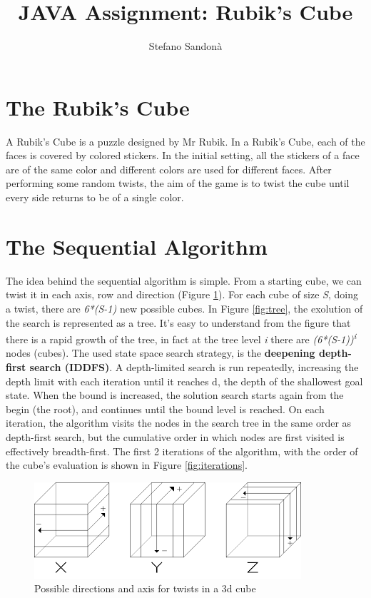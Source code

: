 \documentclass[a4paper]{article}
\begin{document}
\title{JAVA Assignment: Rubik's Cube}
\author{Stefano Sandonà}
\date{}
		
\maketitle

\section{The Rubik's Cube}
\label{sec:rubiks_cube}

A Rubik's Cube is a puzzle designed by Mr Rubik. In a Rubik's Cube, each of the faces is covered by colored stickers. In the initial setting, all the stickers of a face are of the same color and different colors are used for different faces. After performing some random twists, the aim of the game is to twist the cube until every side returns to be of a single color. 

\section{The Sequential Algorithm}
\label{sec:seq_algo}
The idea behind the sequential algorithm is simple. From a starting cube, we can twist it in each axis, row and direction (Figure \ref{fig:tw}). For each cube of size \textit{S}, doing a twist, there are \textit{6*(S-1)} new possible cubes. In Figure \ref{fig:tree}, the exolution of the search is represented as a tree. It's easy to understand from the figure that there is a rapid growth of the tree, in fact at the tree level \textit{i} there are \textit{(6*(S-1))\textsuperscript{i}} nodes (cubes).
The used state space search strategy, is the \textbf{deepening depth-first search (IDDFS)}. A depth-limited search is run repeatedly, increasing the depth limit with each iteration until it reaches d, the depth of the shallowest goal state. When the bound is increased, the solution search starts again from the begin (the root), and continues until the bound level is reached. On each iteration, the algorithm visits the nodes in the search tree in the same order as depth-first search, but the cumulative order in which nodes are first visited is effectively breadth-first. The first 2 iterations of the algorithm, with the order of the cube's evaluation is shown in Figure \ref{fig:iterations}.

\begin{figure}[ht]
  \centering
  \includegraphics[width=0.5\linewidth]{xyz}
  \caption{Possible directions and axis for twists in a 3d cube}
  \label{fig:tw}
\end{figure}
\FloatBarrier
\end{document}
